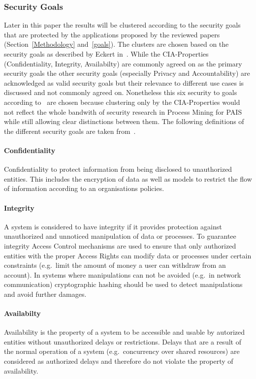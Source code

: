 \documentclass[runningheads]{llncs}
\begin{document}
\subsubsection{Security Goals}\label{goals_def}
Later in this paper the results will be clustered according to the security goals that are protected by the applications proposed by the reviewed papers (Section~\ref{Methodology} and~\ref{goals}).
The clusters are chosen based on the security goals as described by Eckert in~\cite{Eckert}. While the CIA-Properties (Confidentiality, Integrity, Availabilty) are commonly agreed on as the
primary security goals the other security goals (especially Privacy and Accountability) are acknowledged as valid security goals but their relevance to different use cases is discussed and
not commonly agreed on. %
Nonetheless this six security to goals according to~\cite{Eckert} are chosen because clustering only by the CIA-Properties would not reflect the whole bandwith of security research in Process Mining
for PAIS while still allowing clear distinctions between them. The following definitions of the different security goals are taken from~\cite{Eckert}.
\paragraph{Confidentiality} Confidentiality to protect information from being disclosed to unauthorized entities. This includes the encryption of data as well as models to restrict the flow of
information according to an organisations policies.
\paragraph{Integrity} A system is considered to have integrity if it provides protection against unauthorized and unnoticed manipulation of data or processes. To guarantee integrity
Access Control mechanisms are used to ensure that only authorized entities with the proper Access Rights can modify data or processes under certain constraints (e.g.\ limit the amount of money
a user can withdraw from an account). In systems where manipulations can not be avoided (e.g.\ in network communication) cryptographic hashing should be used to detect manipulations and
avoid further damages.
\paragraph{Availabilty} Availability is the property of a system to be accessible and usable by autorized entities without unauthorized delays or restrictions. Delays that are a result of the
normal operation of a system (e.g.\ concurrency over shared resources) are considered as authorized delays and therefore do not violate the property of availability.
\end{document}
